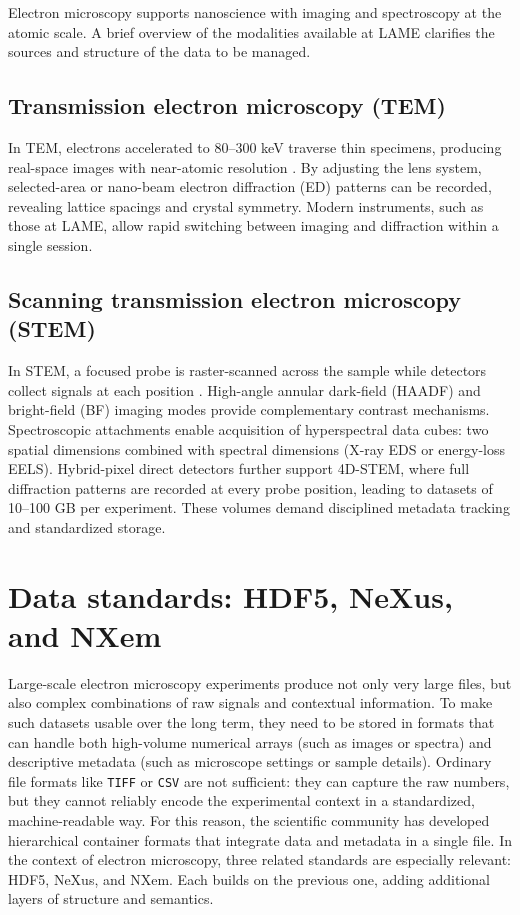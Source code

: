 Electron microscopy supports nanoscience with imaging and spectroscopy at the atomic scale. 
A brief overview of the modalities available at LAME clarifies the sources and structure of the data to be managed.


\subsection{Transmission electron microscopy (TEM)}

In TEM, electrons accelerated to 80--300 keV traverse thin specimens, producing real-space images with near-atomic resolution \parencite{EMoverview}. 
By adjusting the lens system, selected-area or nano-beam electron diffraction (ED) patterns can be recorded, revealing lattice spacings and crystal symmetry. 
Modern instruments, such as those at LAME, allow rapid switching between imaging and diffraction within a single session.

\subsection{Scanning transmission electron microscopy (STEM)}

In STEM, a focused probe is raster-scanned across the sample while detectors collect signals at each position \parencite{EMoverview}. 
High-angle annular dark-field (HAADF) and bright-field (BF) imaging modes provide complementary contrast mechanisms. 
Spectroscopic attachments enable acquisition of hyperspectral data cubes: two spatial dimensions combined with spectral dimensions (X-ray EDS or energy-loss EELS). 
Hybrid-pixel direct detectors further support 4D-STEM, where full diffraction patterns are recorded at every probe position, leading to datasets of 10–100 GB per experiment. 
These volumes demand disciplined metadata tracking and standardized storage.

\section{Data standards: HDF5, NeXus, and NXem}\label{sec:nexus-format}

Large-scale electron microscopy experiments produce not only very large files, but also complex combinations of raw signals and contextual information. 
To make such datasets usable over the long term, they need to be stored in formats that can handle both high-volume numerical arrays (such as images or spectra) and descriptive metadata (such as microscope settings or sample details). 
Ordinary file formats like \texttt{TIFF} or \texttt{CSV} are not sufficient: they can capture the raw numbers, but they cannot reliably encode the experimental context in a standardized, machine-readable way. 
For this reason, the scientific community has developed hierarchical container formats that integrate data and metadata in a single file. 
In the context of electron microscopy, three related standards are especially relevant: HDF5, NeXus, and NXem. 
Each builds on the previous one, adding additional layers of structure and semantics.

